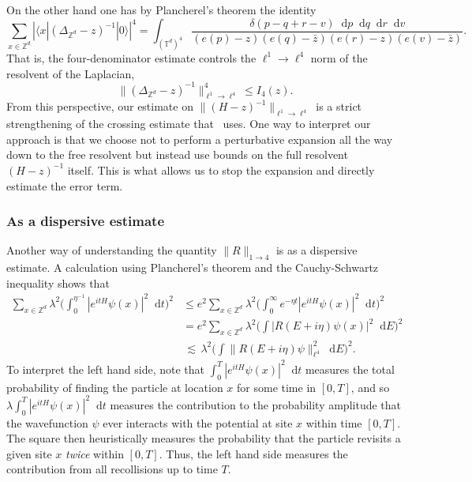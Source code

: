 \documentclass[11pt]{amsart}
\def\bbZ{{\mathbb Z}}
\def\Z{{\mathbb{Z}}}
\def\Torus{{\mathbb T}}
\newcommand{\diff}{\mathop{}\!\mathrm{d}}
\def\lsim{{\,\lesssim\,}}
\def\Braket#1{\langle{#1}\rangle}
\numberwithin{equation}{section}
\numberwithin{theorem}{section}
\begin{document}
On the other hand one has by Plancherel's theorem the identity
\[
\sum_{x\in\bbZ^d} |\Braket{x|(\Delta_{\Z^d}-z)^{-1}|0}|^4
= \int_{(\Torus^d)^4}
\frac{\delta(p-q+r-v)\diff p\diff q \diff r \diff v}
{(e(p)-z)(e(q)-\bar{z})(e(r)-z)(e(v)-\bar{z})}.
\]
That is, the four-denominator estimate controls the $\ell^1\to \ell^4$ norm of the resolvent of the Laplacian,
\[
\| (\Delta_{\Z^d} -z)^{-1}\|_{\ell^1\to\ell^4}^4\leq I_4(z).
\]
From this perspective, our estimate on $\|(H-z)^{-1}\|_{\ell^1\to \ell^4}$  is a strict strengthening of the crossing estimate that~\cite{ESYAnderson} uses.
One way to interpret our approach is that we choose not to perform a perturbative expansion all the way down to the free resolvent but instead
use bounds on the full resolvent $(H-z)^{-1}$ itself.  This is what allows us to stop the expansion and directly estimate the error term.

\subsubsection{As a dispersive estimate}
Another way of understanding the quantity $\|R\|_{1\to 4}$ is as a dispersive estimate.  A calculation using Plancherel's theorem and
the Cauchy-Schwartz inequality shows that
\begin{equation}
\label{eq:onefourrecollision}
\begin{split}
\sum_{x\in\bbZ^d} \lambda^2 \Big(\int_0^{\eta^{-1}} |e^{itH} \psi(x)|^2 \diff t \Big)^2
&\leq e^2
\sum_{x\in\bbZ^d} \lambda^2 \Big(\int_0^\infty e^{-\eta t} |e^{itH} \psi(x)|^2 \diff t \Big)^2  \\
&= e^2
\sum_{x\in\bbZ^d} \lambda^2 \Big(\int |R(E+i\eta)\psi(x)|^2 \diff E \Big)^2  \\
&\lsim \lambda^2 \Big(\int \|R(E+i\eta)\psi\|_{\ell^4}^2 \diff E\Big)^2.
\end{split}
\end{equation}
To interpret the left hand side, note that $\int_0^T |e^{itH}\psi(x)|^2\diff t$ measures the total probability of finding the particle at
location $x$ for some time in $[0,T]$, and so $\lambda \int_0^T |e^{itH}\psi(x)|^2\diff t$ measures the contribution to the probability amplitude
 that the wavefunction $\psi$ ever interacts with the potential at site $x$ within time $[0,T]$.  The square then heuristically measures the
probability that the particle revisits a given site $x$ \textit{twice} within $[0,T]$.  Thus, the left hand side measures the contribution from
all recollisions up to time $T$.
\end{document}
